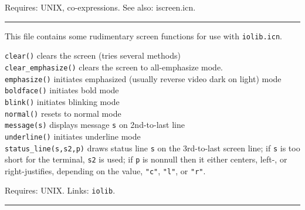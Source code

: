 


Requires: UNIX, co-expressions. See also: iscreen.icn.

\vspace{0.25cm}\hrule{}

This file contains some rudimentary screen functions for use with
\texttt{iolib.icn}.

\texttt{clear()} clears the screen (tries several methods)\\
\texttt{clear\_emphasize()} clears the screen to all-emphasize
mode.\\
\texttt{emphasize()} initiates emphasized (usually reverse video dark on
light) mode\\
\texttt{boldface()} initiates bold mode\\
\texttt{blink()} initiates blinking mode\\
\texttt{normal()} resets to normal mode\\
\texttt{message(s)} displays message \texttt{s} on 2nd-to-last
line\\
\texttt{underline()} initiates underline mode\\
\texttt{status\_line(s,s2,p)} draws status line \texttt{s} on the
3rd-to-last screen line; if \texttt{s} is too short for the terminal,
\texttt{s2} is used; if \texttt{p} is nonnull then it either centers,
left-, or right-justifies, depending on the value,
\texttt{"c"},
\texttt{"l"}, or
\texttt{"r"}.

Requires: UNIX. Links: \texttt{iolib}.

\vspace{0.25cm}\hrule{}

